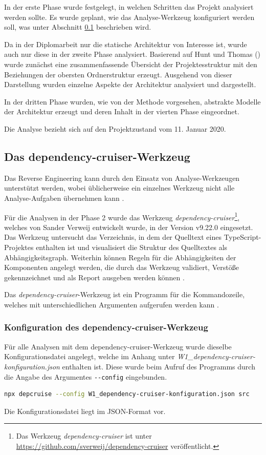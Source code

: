 In der erste Phase wurde festgelegt, in welchen Schritten das Projekt analysiert werden sollte. 
Es wurde geplant, wie das Analyse-Werkzeug konfiguriert werden soll, was unter Abschnitt \ref{dependency-cruiser} beschrieben wird. 

Da in der Diplomarbeit nur die statische Architektur von Interesse ist, wurde auch nur diese in der zweite Phase analysiert. 
Basierend auf Hunt und Thomas (\citeyear[vgl.][23]{Hunt2002}) wurde zunächst eine zusammenfassende Übersicht der Projektesstruktur mit den Beziehungen der obersten Ordnerstruktur erzeugt. 
Ausgehend von dieser Darstellung wurden einzelne Aspekte der Architektur analysiert und dargestellt.

In der dritten Phase wurden, wie von der Methode vorgesehen, abstrakte Modelle der Architektur erzeugt und deren Inhalt in der vierten Phase eingeordnet.


Die Analyse bezieht sich auf den Projektzustand vom 11. Januar 2020. 

\subsection{Das {dependency-cruiser}-Werkzeug}
\label{dependency-cruiser}
Das Reverse Engineering kann durch den Einsatz von Analyse-Werkzeugen unterstützt werden, wobei üblicherweise ein einzelnes Werkzeug nicht alle Analyse-Aufgaben übernehmen kann \autocite[vgl.][381]{Bass2013}.  

Für die Analysen in der Phase 2 wurde das Werkzeug \emph{dependency-cruiser}\footnote{Das Werkzeug \emph{dependency-cruiser} ist unter \url{https://github.com/sverweij/dependency-cruiser} veröffentlicht.}, welches von Sander Verweij entwickelt wurde, in der Version v9.22.0 eingesetzt. 
Das Werkzeug untersucht das Verzeichnis, in dem der Quelltext eines TypeScript-Projektes enthalten ist und visualisiert die Struktur des Quelltextes als Abhängigkeitsgraph. Weiterhin können Regeln für die Abhängigkeiten der Komponenten angelegt werden, die durch das Werkzeug validiert, Verstöße gekennzeichnet und als Report ausgeben werden können \autocite[vgl.][]{Verweij:Dependency}. 

Das \emph{dependency-cruiser}-Werkzeug ist ein Programm für die Kommandozeile, welches mit unterschiedlichen Argumenten aufgerufen werden kann \autocite[vgl.][]{Verweij:CLI}.

\subsubsection{Konfiguration des dependency-cruiser-Werkzeug}
Für alle Analysen mit dem dependency-cruiser-Werkzeug wurde dieselbe Konfigurationsdatei angelegt, welche im Anhang unter \emph{W1\_dependency-cruiser-konfiguration.json} enthalten ist. Diese wurde beim Aufruf des Programms durch die Angabe des Argumentes \lstinline|--config| eingebunden.
\begin{lstlisting}[language={sh}, label=depcruise-config, caption=Aufruf des \emph{dependency-cruiser} mit eingebundener Konfigurationsdatei]
    npx depcruise --config W1_dependency-cruiser-konfiguration.json src
\end{lstlisting}
Die Konfigurationsdatei liegt im JSON-Format vor. 

